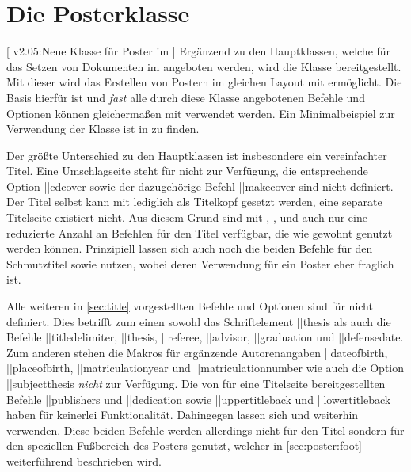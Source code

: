 \chapter[Die Posterklasse \Class{tudscrposter}]{%
  Die Posterklasse%
}
%
\begin{DeclareEntity}{}[%
  v2.05:Neue Klasse für Poster im \TUDCD%
]
%
Ergänzend zu den Hauptklassen, welche für das Setzen von Dokumenten im \TUDCD 
angeboten werden, wird die Klasse  bereitgestellt. Mit 
dieser wird das Erstellen von Postern im gleichen Layout mit  
ermöglicht. Die Basis hierfür ist  und \emph{fast} alle 
durch diese Klasse angebotenen Befehle und Optionen können gleichermaßen mit 
 verwendet werden. Ein Minimalbeispiel zur Verwendung der 
Klasse ist in  zu finden.

Der größte Unterschied zu den Hauptklassen ist insbesondere ein vereinfachter 
Titel. Eine Umschlagseite steht für  nicht zur Verfügung, 
die entsprechende Option \Option||{cdcover} sowie der dazugehörige Befehl 
\Macro||{makecover} sind nicht definiert. Der Titel selbst kann mit 
 lediglich als Titelkopf gesetzt werden, eine separate 
Titelseite existiert nicht. Aus diesem Grund sind mit , 
,  und  auch nur eine 
reduzierte Anzahl an Befehlen für den Titel verfügbar, die wie gewohnt genutzt 
werden können. Prinzipiell lassen sich auch noch die beiden Befehle für den 
Schmutztitel  sowie  nutzen, wobei deren 
Verwendung für ein Poster eher fraglich ist.

Alle weiteren in \autoref{sec:title} vorgestellten Befehle und Optionen sind 
für  nicht definiert. Dies betrifft zum einen sowohl das 
Schriftelement \Font||{thesis} als auch die Befehle \Macro||{titledelimiter}, 
\Macro||{thesis}, \Macro||{referee}, \Macro||{advisor}, \Macro||{graduation} 
und \Macro||{defensedate}. Zum anderen stehen die Makros für ergänzende 
Autorenangaben \Macro||{dateofbirth}, \Macro||{placeofbirth}, 
\Macro||{matriculationyear} und \Macro||{matriculationnumber} wie auch 
die Option \Option||{subjectthesis} \emph{nicht} zur Verfügung. Die von 
\KOMAScript für eine Titelseite bereitgestellten Befehle \Macro||{publishers} 
und \Macro||{dedication} sowie \Macro||{uppertitleback} und 
\Macro||{lowertitleback} haben für  keinerlei 
Funktionalität. Dahingegen lassen sich  und  
weiterhin verwenden. Diese beiden Befehle werden allerdings nicht für den Titel 
sondern für den speziellen Fußbereich des Posters genutzt, welcher in 
\autoref{sec:poster:foot} weiterführend beschrieben wird.


\end{DeclareEntity}
